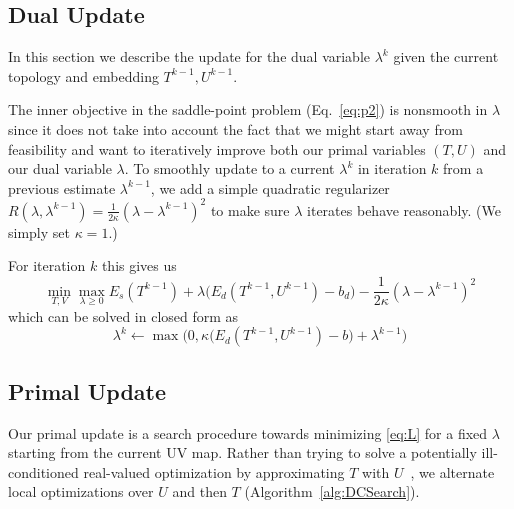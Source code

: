 \subsection{Dual Update}
\label{sec:self_weighting}
\label{sec:dualUpdate}


%
In this section we describe the update for the dual variable $\lambda^k$ given the current topology and embedding $T^{k-1}, U^{k-1}$.

The inner objective in the saddle-point problem (Eq.~\ref{eq:p2}) is nonsmooth in $\lambda$ since it does not take into account the fact that we might start away from feasibility and want to iteratively improve both our primal variables $(T, U)$ and our dual variable $\lambda$. To smoothly update to a current $\lambda^{k}$ in iteration $k$ from a previous estimate $\lambda^{k-1}$, we add a simple quadratic regularizer $R(\lambda,\lambda^{k-1}) = \frac{1}{2\kappa} (\lambda- \lambda^{k-1})^2$ to make sure $\lambda$ iterates behave reasonably. (We simply set $\kappa = 1$.)

For iteration $k$ this gives us 
\[ \min_{T,V} \max_{\lambda \geq 0} E_{s}(T^{k-1}) + \lambda \big( E_{d}(T^{k-1}, U^{k-1}) - b_d\big) - \frac{1}{2\kappa} (\lambda- \lambda^{k-1})^2 \]
which can be solved in closed form as
\[ \lambda^{k} \leftarrow \max\big(0,\kappa \big( E_{d}(T^{k-1}, U^{k-1}) -b \big) + \lambda^{k-1}\big) \]




\subsection{Primal Update}
\label{sec:primalUpdate}

Our primal update is a search procedure towards minimizing \eqref{eq:L} for a fixed $\lambda$ starting from the current UV map.
Rather than trying to solve a potentially ill-conditioned real-valued optimization by approximating $T$ with $U$\ \cite{Poranne2017Autocuts}, we alternate local optimizations over $U$ and then $T$ (Algorithm~\ref{alg:DCSearch}).

